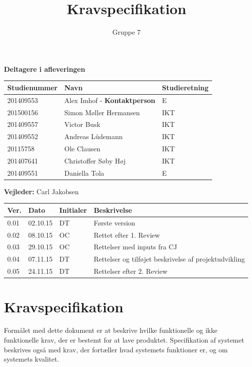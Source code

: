 \documentclass[oneside]{memoir}
\title{Kravspecifikation}
\author{Gruppe 7}
\begin{document}
		\maketitle
	\textbf{Deltagere i afleveringen}
			\begin{table}[H]
		\centering
		\label{my-label}
		\begin{tabular}{|l|l|l|}
			\hline
			Studienummer & Navn                   & Studieretning \\ \hline
			201409553    & Alex Imhof - \textbf{Kontaktperson } &E\\ \hline
			201500156    & Simon Møller Hermansen & IKT           \\ \hline
			201409557    & Victor Busk            & IKT           \\ \hline
			201409552    & Andreas Lüdemann       & IKT           \\ \hline
			20115758     & Ole Clausen            & IKT           \\ \hline
			201407641    & Christoffer Søby Høj   & IKT           \\ \hline
			201409551    & Daniella Tola          & E             \\ \hline
		\end{tabular}
	\end{table}
\begin{flushleft}
		\textbf{Vejleder: } Carl Jakobsen
\end{flushleft}
\begin{table}[]
	\centering
	\label{my-label}
	\begin{tabular}{|l|l|l|l|}
		\hline
		Ver. & Dato     & Initialer & Beskrivelse    \\ \hline
		0.01 & 02.10.15 & DT        & Første version \\ \hline
		0.02 & 08.10.15 & OC		& Rettet efter 1. Review \\ \hline
		0.03 & 29.10.15 & OC 		& Rettelser med inputs fra CJ \\ \hline
		0.04 & 07.11.15 & DT		& Rettelser og tilføjet beskrivelse af projektudvikling \\ \hline
		0.05 & 24.11.15 & DT		& Rettelser efter 2. Review \\ \hline
	\end{tabular}
\end{table}

	\newpage
		\tableofcontents
		\chapter{Kravspecifikation}
		Formålet med dette dokument er at beskrive hvilke funktionelle og ikke funktionelle krav, der er bestemt for at lave produktet.
Specifikation af systemet beskrives også med krav, der fortæller hvad systemets funktioner er, og om
systemets kvalitet.
\end{document}
